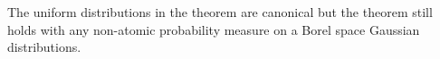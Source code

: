 
%

\begin{rem}\label{rem:sym}
The uniform distributions in the theorem are canonical but the theorem still holds with any non-atomic probability measure on a Borel space \eg Gaussian distributions.
\end{rem}

